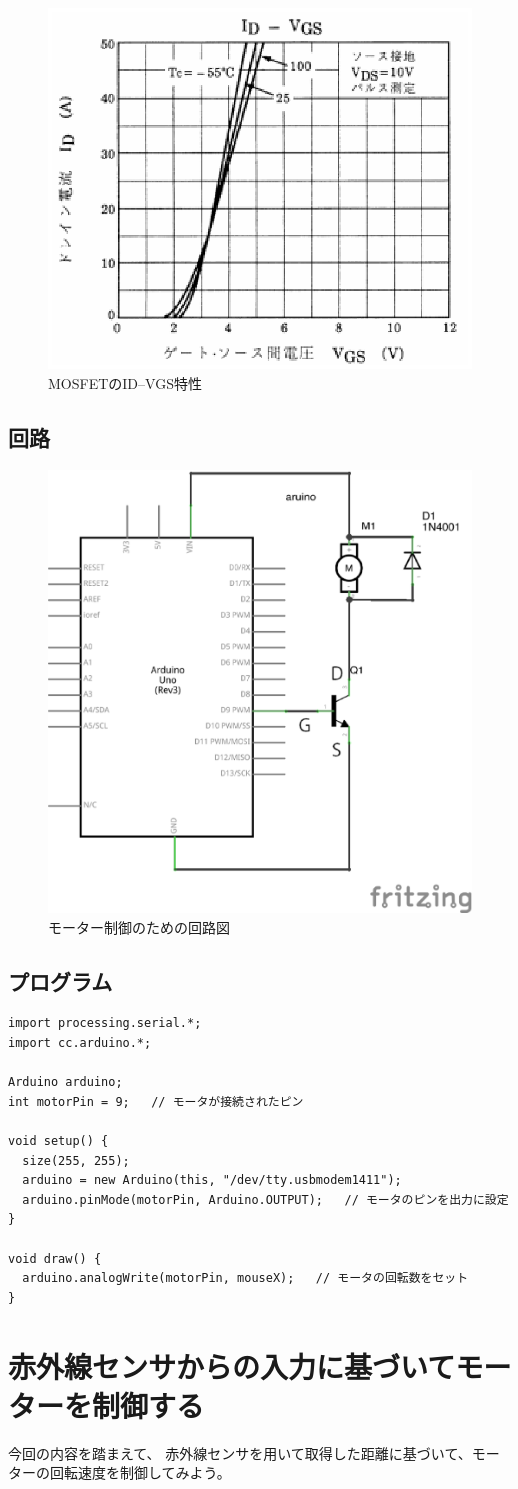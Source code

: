 \documentclass[11pt,a4paper]{jarticle}
\begin{document}
\begin{figure}[htbp]
 \centering
 \includegraphics[width=0.5\columnwidth]{img/fet_ID_VGS.eps}
 \begin{center}
  \caption{MOSFETのID--VGS特性}
   \label{fet_ID_VGS}
 \end{center}
\end{figure}

\subsection*{回路}
\begin{figure}[htbp]
 \centering
 \includegraphics[width=0.5\columnwidth]{img/motor_control_circuit.eps}
 \begin{center}
  \caption{モーター制御のための回路図}
 \end{center}
\end{figure}

\subsection*{プログラム}
\begin{lstlisting}
import processing.serial.*;
import cc.arduino.*;
 
Arduino arduino;
int motorPin = 9;   // モータが接続されたピン
 
void setup() {
  size(255, 255);
  arduino = new Arduino(this, "/dev/tty.usbmodem1411");
  arduino.pinMode(motorPin, Arduino.OUTPUT);   // モータのピンを出力に設定
}
 
void draw() {
  arduino.analogWrite(motorPin, mouseX);   // モータの回転数をセット
}
\end{lstlisting}


\section{赤外線センサからの入力に基づいてモーターを制御する}
今回の内容を踏まえて、
赤外線センサを用いて取得した距離に基づいて、モーターの回転速度を制御してみよう。
\end{document}
